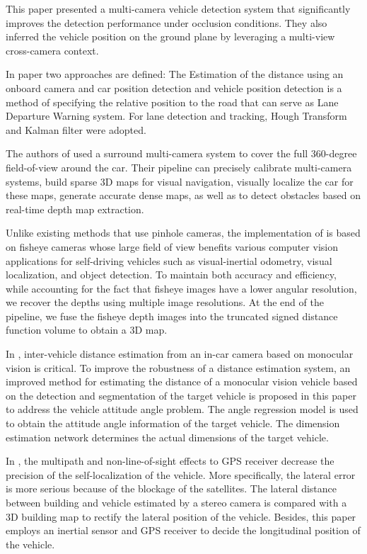 This paper \cite{Wu2019} presented a multi-camera vehicle detection system that significantly improves the detection performance under occlusion conditions. They also inferred the vehicle position on the ground plane by leveraging a multi-view cross-camera context.

In paper \cite{Ali2016} two approaches are defined: The  Estimation of the distance using an onboard camera and car position detection and vehicle position detection is a method of specifying the relative position to the road that can serve as Lane Departure Warning system. For lane detection and tracking, Hough Transform and Kalman filter were adopted.


The authors of \cite{Hane2017} used a surround multi-camera system to cover the full 360-degree field-of-view around the car. Their pipeline can precisely calibrate multi-camera systems, build sparse 3D maps for visual navigation, visually localize the car for these maps, generate accurate dense maps, as well as to detect obstacles based on real-time depth map extraction.

Unlike existing methods that use pinhole cameras, the implementation of \cite{Cui2019} is based on fisheye cameras whose large field of view benefits various computer vision applications for self-driving vehicles such as visual-inertial odometry, visual localization, and object detection. To maintain both accuracy and efficiency, while accounting for the fact that fisheye images have a lower angular resolution, we recover the depths using multiple image resolutions. At the end of the pipeline, we fuse the fisheye depth images into the truncated signed distance function volume to obtain a 3D map.

In \cite{Huang2019}, inter-vehicle distance estimation from an in-car camera based on monocular vision is critical. To improve the robustness of a distance estimation system, an improved method for estimating the distance of a monocular vision vehicle based on the detection and segmentation of the target vehicle is proposed in this paper to address the vehicle attitude angle problem. The angle regression model is used to obtain the attitude angle information of the target vehicle. The dimension estimation network determines the actual dimensions of the target vehicle.

In \cite{Bao2016}, the multipath and non-line-of-sight effects to GPS receiver decrease the precision of the self-localization of the vehicle. More specifically, the lateral error is more serious because of the blockage of the satellites. The lateral distance between building and vehicle estimated by a stereo camera is compared with a 3D building map to rectify the lateral position of the vehicle. Besides, this paper employs an inertial sensor and GPS receiver to decide the longitudinal position of the vehicle.

